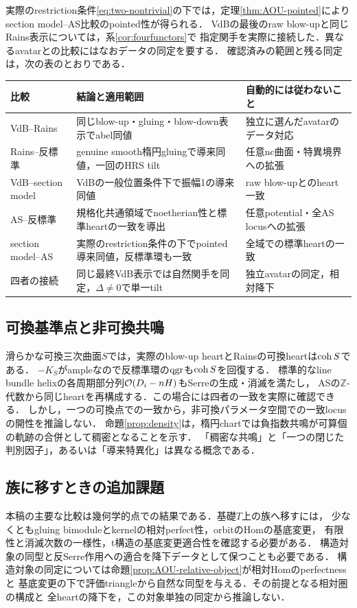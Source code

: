 実際のrestriction条件\eqref{eq:two-nontrivial}の下では，定理\ref{thm:AOU-pointed}により
section model--AS比較のpointed性が得られる．
VdBの最後のraw blow-upと同じRains表示については，系\ref{cor:fourfunctors}で
指定関手を実際に接続した．異なるavatarとの比較にはなおデータの同定を要する．
確認済みの範囲と残る同定は，次の表のとおりである．
\begin{center}
\small
\begin{tabular}{p{}p{}p{}}
\toprule
比較 & 結論と適用範囲 & 自動的には従わないこと\\
\midrule
VdB--Rains & 同じblow-up・gluing・blow-down表示でabel同値 & 独立に選んだavatarのデータ対応\\
Rains--反標準 & genuine smooth楕円gluingで導来同値，一回のHRS tilt & 任意nc曲面・特異境界への拡張\\
VdB--section model & VdBの一般位置条件下で振幅1の導来同値 & raw blow-upとのheart一致\\
AS--反標準 & 規格化共通領域でnoetherian性と標準heartの一致を導出 & 任意potential・全AS locusへの拡張\\
section model--AS & 実際のrestriction条件の下でpointed導来同値，反標準環も一致 & 全域での標準heartの一致\\
四者の接続 & 同じ最終VdB表示では自然関手を同定，$\Delta\ne0$で単一tilt & 独立avatarの同定，相対降下\\
\bottomrule
\end{tabular}
\end{center}

\subsection{可換基準点と非可換共鳴}
滑らかな可換三次曲面$S$では，実際のblow-up heartとRainsの可換heartは$\operatorname{coh} S$である．
$-K_S$がampleなので反標準環の$\operatorname{qgr}$も$\operatorname{coh} S$を回復する．
標準的なline bundle helixの各周期部分列$\mathcal O(D_i-nH)$もSerreの生成・消滅を満たし，
ASの$\mathbb Z$-代数から同じheartを再構成する．この場合には四者の一致を実際に確認できる．
しかし，一つの可換点での一致から，非可換パラメータ空間での一致locusの開性を推論しない．
命題\ref{prop:density}は，楕円chartでは負指数共鳴が可算個の軌跡の合併として稠密となることを示す．
「稠密な共鳴」と「一つの閉じた判別因子」，あるいは「導来特異化」は異なる概念である．

\subsection{族に移すときの追加課題}
本稿の主要な比較は幾何学的点での結果である．基礎$T$上の族へ移すには，
少なくともgluing bimoduleとkernelの相対perfect性，orbitのHomの基底変更，
有限性と消滅次数の一様性，t構造の基底変更適合性を確認する必要がある．
構造対象の同型と反Serre作用への適合を降下データとして保つことも必要である．
構造対象の同定については命題\ref{prop:AOU-relative-object}が相対Homのperfectnessと
基底変更の下で評価triangleから自然な同型を与える．その前提となる相対圏の構成と
全heartの降下を，この対象単独の同定から推論しない．

